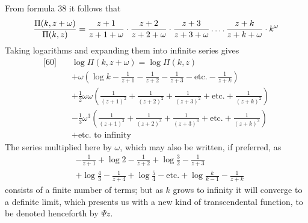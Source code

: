 From formula 38 it follows that
\[
\frac{\Pi(k,z+\omega)}{\Pi(k,z)}
=\frac{z+1}{z+1+\omega}\cdot\frac{z+2}{z+2+\omega}\cdot\frac{z+3}{z+3+\omega}
\mathinner{.\,.\,.\,.}\frac{z+k}{z+k+\omega}\cdot k^{\omega}
\]
Taking logarithms and expanding them into infinite series gives
\[
\begin{aligned}
{}\text{[60]}\quad&\log\Pi(k,z+\omega)=\log\Pi(k,z)\\
&+\omega\left(\log k-\frac{1}{z+1}-\frac{1}{z+2}-\frac{1}{z+3}-\text{etc.}-\frac{1}{z+k}\right)\\
&+\tfrac12\omega\omega\left(\frac{1}{(z+1)^2}+\frac{1}{(z+2)^2}+\frac{1}{(z+3)^2}+\text{etc.}+\frac{1}{(z+k)^2}\right)\\
&-\tfrac13\omega^3\left(\frac{1}{(z+1)^3}+\frac{1}{(z+2)^3}+\frac{1}{(z+3)^3}+\text{etc.}+\frac{1}{(z+k)^3}\right)\\
&+\text{etc. to infinity}
\end{aligned}
\]
The series multiplied here by $\omega$, which may also be written, if preferred, as
\[
\begin{aligned}
&-\frac{1}{z+1}+\log 2-\frac{1}{z+2}+\log\tfrac32-\frac{1}{z+3}\\[4pt]
&+\log\tfrac43-\frac{1}{z+4}+\log\tfrac54-\text{etc.}
+\log\frac{k}{k-1}-\frac{1}{z+k}
\end{aligned}
\]
consists of a finite number of terms; but as $k$ grows to infinity it will converge to a definite limit, which presents us with a new kind of transcendental function, to be denoted henceforth by $\Psi z$.

